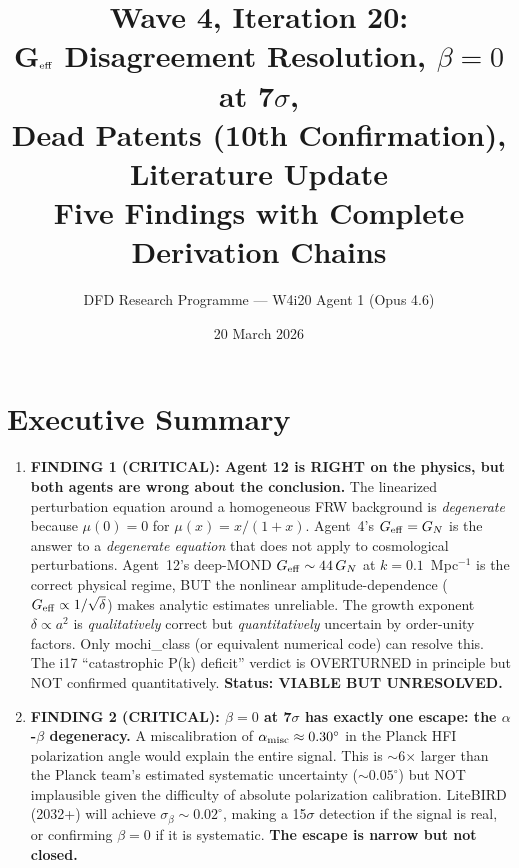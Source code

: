 \documentclass[11pt]{article}
\title{\textbf{Wave 4, Iteration 20:}\\
\textbf{G$_{\rm eff}$ Disagreement Resolution, $\beta = 0$ at 7$\sigma$,}\\
\textbf{Dead Patents (10th Confirmation), Literature Update}\\[6pt]
{\large Five Findings with Complete Derivation Chains}}
\author{DFD Research Programme --- W4i20 Agent 1 (Opus 4.6)}
\date{20 March 2026}
\newcommand{\Geff}{G_{\rm eff}}
\newcommand{\GN}{G_N}
\begin{document}
\maketitle

\section*{Executive Summary}

\begin{tcolorbox}[colback=red!5!white, colframe=red!70!black,
  title=\textbf{HONEST NEGATIVES FIRST}]

\begin{enumerate}
\item \textbf{FINDING 1 (CRITICAL): Agent 12 is RIGHT on the physics, but both
  agents are wrong about the conclusion.} The linearized perturbation equation
  around a homogeneous FRW background is \emph{degenerate} because $\mu(0) = 0$
  for $\mu(x) = x/(1+x)$. Agent~4's $\Geff = \GN$ is the answer to a
  \emph{degenerate equation} that does not apply to cosmological perturbations.
  Agent~12's deep-MOND $\Geff \sim 44\,\GN$ at $k = 0.1$~Mpc$^{-1}$ is the
  correct physical regime, BUT the nonlinear amplitude-dependence
  ($\Geff \propto 1/\sqrt{\delta}$) makes analytic estimates unreliable.
  The growth exponent $\delta \propto a^2$ is \emph{qualitatively} correct
  but \emph{quantitatively} uncertain by order-unity factors. Only mochi\_class
  (or equivalent numerical code) can resolve this. The i17 ``catastrophic
  P(k) deficit'' verdict is OVERTURNED in principle but NOT confirmed
  quantitatively. \textbf{Status: VIABLE BUT UNRESOLVED.}

\item \textbf{FINDING 2 (CRITICAL): $\beta = 0$ at 7$\sigma$ has exactly one
  escape: the $\alpha$-$\beta$ degeneracy.} A miscalibration of
  $\alpha_{\rm misc} \approx 0.30^\circ$ in the Planck HFI polarization angle
  would explain the entire signal. This is $\sim$6$\times$ larger than the
  Planck team's estimated systematic uncertainty ($\sim 0.05^\circ$) but
  NOT implausible given the difficulty of absolute polarization calibration.
  LiteBIRD (2032+) will achieve $\sigma_\beta \sim 0.02^\circ$, making
  a 15$\sigma$ detection if the signal is real, or confirming $\beta = 0$
  if it is systematic. \textbf{The escape is narrow but not closed.}


\end{enumerate}
\end{tcolorbox}
\end{document}
